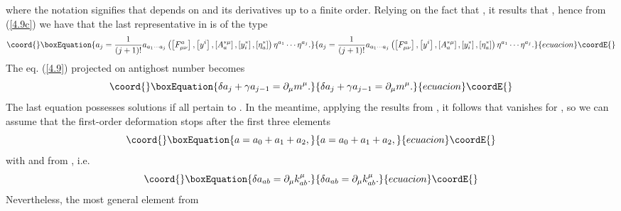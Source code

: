 \documentclass[a4paper,12pt]{article}
\begin{document}
where the notation \coordHE{}
signifies that \coordHE{} depends on \coordHE{} and
its derivatives up to a finite order.
Relying on the fact that \coordHE{}, it results that
\coordHE{},
hence from (\ref{4.9c}) we have that
the last representative in \coordHE{} is of
the type
\begin{equation}\coord{}\boxEquation{
a_{j}=\frac{1}{\left( j+1\right) !}
a_{a_{1}\cdots a_{j}}\left( \left[ F_{\mu
\nu }^{a}\right] ,\left[ y^{i}\right] ,
\left[ A_{a}^{*\mu }\right] ,\left[
y_{i}^{*}\right] ,\left[ \eta _{a}^{*}
\right] \right) \eta ^{a_{1}}\cdots
\eta ^{a_{j}}.  \label{4.10}
}{
a_{j}=\frac{1}{\left( j+1\right) !}
a_{a_{1}\cdots a_{j}}\left( \left[ F_{\mu
\nu }^{a}\right] ,\left[ y^{i}\right] ,
\left[ A_{a}^{*\mu }\right] ,\left[
y_{i}^{*}\right] ,\left[ \eta _{a}^{*}
\right] \right) \eta ^{a_{1}}\cdots
\eta ^{a_{j}}.  }{ecuacion}\coordE{}\end{equation}
The eq. (\ref{4.9}) projected on antighost
number \coordHE{}
becomes
\begin{equation}\coord{}\boxEquation{
\delta a_{j}+\gamma a_{j-1}=
\partial _{\mu }m^{\mu }.  \label{4.10a}
}{
\delta a_{j}+\gamma a_{j-1}=
\partial _{\mu }m^{\mu }.  }{ecuacion}\coordE{}\end{equation}
The last equation possesses solutions if all
\coordHE{} pertain
to \coordHE{}.
In the meantime, applying the results
from \cite{20}, it follows that
\coordHE{} vanishes for
\coordHE{}, so we can assume that the
first-order deformation stops after the
first three elements
\begin{equation}\coord{}\boxEquation{
a=a_{0}+a_{1}+a_{2},  \label{4.11}
}{
a=a_{0}+a_{1}+a_{2},  }{ecuacion}\coordE{}\end{equation}
with \coordHE{} and
\coordHE{} from \coordHE{}, i.e.
\begin{equation}\coord{}\boxEquation{
\delta a_{ab}=\partial _{\mu }k_{ab}^{\mu }.  \label{4.12}
}{
\delta a_{ab}=\partial _{\mu }k_{ab}^{\mu }.  }{ecuacion}\coordE{}\end{equation}
Nevertheless, the most general element from
\end{document}
